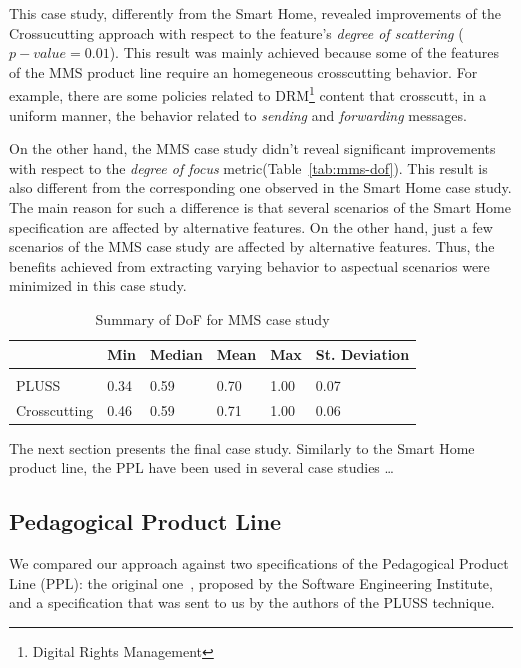 \documentclass{acm_proc_article-sp}
\begin{document}
This case study, differently from the Smart Home, revealed improvements of the
Crossucutting approach with respect to the feature's \emph{degree of scattering}
($p-value=0.01$). This result was mainly achieved because some of the features of
the MMS product line require an homegeneous crosscutting behavior. For example,
there are some policies related to DRM\footnote{Digital Rights Management}
content that crosscutt, in a uniform manner, the behavior related to
\emph{sending} and \emph{forwarding} messages.


On the other hand, the MMS case study didn't reveal significant improvements with
respect to the \emph{degree of focus} metric(Table~\ref{tab:mms-dof}). This
result is also different from the corresponding one observed in the Smart Home
case study. The main reason for such a difference is that several scenarios of
the Smart Home specification are affected by alternative features. On the other
hand, just a few scenarios of the MMS case study are affected by alternative
features. Thus, the benefits achieved from extracting varying behavior to
aspectual scenarios were minimized in this case study.

\begin{table}[htb] \centering
\caption{Summary of DoF for MMS case study}
\label{tab:mms-dos}
\begin{small}
\begin{tabular}{llllll} \hline
					& Min 	& Median 	& Mean 	& Max 	& St. Deviation \\ \hline \\
	PLUSS			& 0.34	& 0.59		& 0.70	& 1.00	& 0.07			\\
	Crosscutting	& 0.46  & 0.59   	& 0.71 	& 1.00 	& 0.06			\\ \hline	
\end{tabular}
\end{small}
\end{table}

The next section presents the final case study. Similarly to the Smart Home
product line, the PPL have been used in several case studies \ldots

\subsection{Pedagogical Product Line}

We compared our approach against two specifications of the Pedagogical Product
Line (PPL): the original one~\cite{ppl-url}, proposed by the Software Engineering
Institute, and a specification that was sent to us by the authors of the PLUSS
technique.
\end{document}
